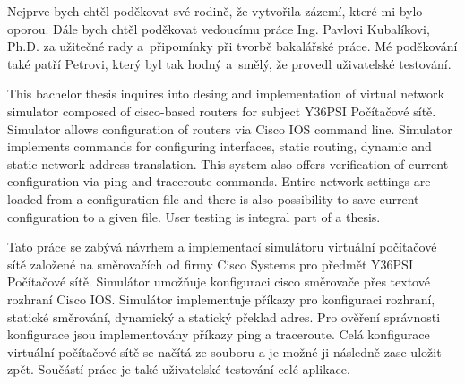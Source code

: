 \documentclass[11pt,twoside,a4paper]{book}
\begin{document}

\coverpagestarts


\acknowledgements
\noindent

Nejprve bych chtěl poděkovat své rodině, že vytvořila zázemí, které mi bylo oporou. Dále bych chtěl poděkovat vedoucímu práce Ing. Pavlovi Kubalíkovi, Ph.D. za užitečné rady a~připomínky při tvorbě bakalářské práce. Mé poděkování také patří Petrovi, který byl tak hodný a~smělý, že provedl uživatelské testování.






 
\abstractpage

This bachelor thesis inquires into desing and implementation of virtual network simulator composed of cisco-based routers for subject Y36PSI Počítačové sítě. Simulator allows configuration of routers via Cisco IOS command line. Simulator implements commands for configuring interfaces, static routing, dynamic and static network address translation. This system also offers verification of current configuration via ping and traceroute commands. Entire network settings are loaded from a configuration file and there is also possibility to save current configuration to a given file. User testing is integral part of a thesis.




\baselineskip

\noindent


Tato práce se zabývá návrhem a implementací simulátoru virtuální počítačové sítě založené na směrovačích od firmy Cisco Systems pro předmět Y36PSI Počítačové sítě. Simulátor umožňuje konfiguraci cisco směrovače přes textové rozhraní Cisco IOS. Simulátor implementuje příkazy pro konfiguraci rozhraní, statické směrování, dynamický a statický překlad adres. Pro ověření správnosti konfigurace jsou implementovány příkazy ping a traceroute. Celá konfigurace virtuální počítačové sítě se načítá ze souboru a je možné ji následně zase uložit zpět. Součástí práce je také uživatelské testování celé aplikace.
\end{document}
